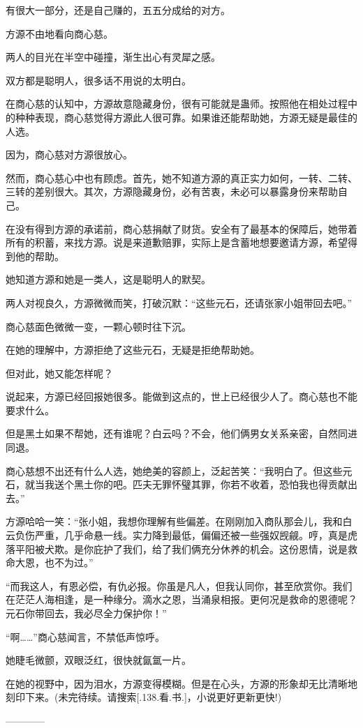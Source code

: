 \begin{this_body}
有很大一部分，还是自己赚的，五五分成给的对方。

方源不由地看向商心慈。

两人的目光在半空中碰撞，渐生出心有灵犀之感。

双方都是聪明人，很多话不用说的太明白。

在商心慈的认知中，方源故意隐藏身份，很有可能就是蛊师。按照他在相处过程中的种种表现，商心慈觉得方源此人很可靠。如果谁还能帮助她，方源无疑是最佳的人选。

因为，商心慈对方源很放心。

然而，商心慈心中也有顾虑。首先，她不知道方源的真正实力如何，一转、二转、三转的差别很大。其次，方源隐藏身份，必有苦衷，未必可以暴露身份来帮助自己。

在没有得到方源的承诺前，商心慈捐献了财货。安全有了最基本的保障后，她带着所有的积蓄，来找方源。说是来道歉赔罪，实际上是含蓄地想要邀请方源，希望得到他的帮助。

她知道方源和她是一类人，这是聪明人的默契。

两人对视良久，方源微微而笑，打破沉默：“这些元石，还请张家小姐带回去吧。”

商心慈面色微微一变，一颗心顿时往下沉。

在她的理解中，方源拒绝了这些元石，无疑是拒绝帮助她。

但对此，她又能怎样呢？

说起来，方源已经回报她很多。能做到这点的，世上已经很少人了。商心慈也不能要求什么。

但是黑土如果不帮她，还有谁呢？白云吗？不会，他们俩男女关系亲密，自然同进同退。

商心慈想不出还有什么人选，她绝美的容颜上，泛起苦笑：“我明白了。但这些元石，就当我送个黑土你的吧。匹夫无罪怀璧其罪，你若不收着，恐怕我也得贡献出去。”

方源哈哈一笑：“张小姐，我想你理解有些偏差。在刚刚加入商队那会儿，我和白云负伤严重，几乎命悬一线。实力降到最低，偏偏还被一些强奴觊觎。哼，真是虎落平阳被犬欺。是你庇护了我们，给了我们俩充分休养的机会。这份恩情，说是救命大恩，也不为过。”

“而我这人，有恩必偿，有仇必报。你虽是凡人，但我认同你，甚至欣赏你。我们在茫茫人海相逢，是一种缘分。滴水之恩，当涌泉相报。更何况是救命的恩德呢？元石你带回去，我必尽全力保护你！”

“啊……”商心慈闻言，不禁低声惊呼。

她睫毛微颤，双眼泛红，很快就氤氲一片。

在她的视野中，因为泪水，方源变得模糊。但是在心头，方源的形象却无比清晰地刻印下来。(未完待续。请搜索[.138.看.书.]，小说更好更新更快!)

------------

\end{this_body}

